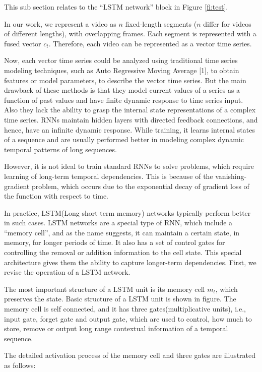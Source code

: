 This sub section relates to
the ``LSTM network'' block in Figure \ref{fi:test}.

In our work, we represent a video as $n$
fixed-length segments ($n$ differ for videos of different lengths),  with overlapping frames.  Each segment
is represented with a fused vector $c_{t}$. Therefore, each video can be represented as a vector time series.


Now, each vector time series could be  analyzed using traditional time series modeling techniques,
such as Auto Regressive Moving Average [1], to obtain features or model parameters, to describe the
vector time series.
But the main drawback of these methods is that they model current values of a series as a function of past values
and have finite dynamic response to time series input. Also they lack the ability to grasp the internal state
representations of a complex time series. RNNs maintain hidden layers with directed feedback connections, and hence,
have an infinite dynamic response. While training, it learns internal states of a sequence
and are usually performed better in modeling complex dynamic temporal patterns of long sequences.


However, it is not ideal to train standard RNNs to solve problems,
which require learning of long-term temporal dependencies. This is because of the vanishing-gradient problem, which occurs
due to the exponential decay of gradient loss of the function with respect to time.

In practice, LSTM(Long short term memory) networks typically perform better in such cases.
LSTM networks are a special type of RNN, which include a ``memory cell'', and as the name suggests,
it can maintain a certain state, in memory, for longer periods of time.
It also has a set of control gates for controlling the removal or addition information to the cell state.
This special architecture gives them the ability to capture longer-term dependencies. First, we revise the operation of a LSTM
network.

The most important structure of a LSTM unit is its memory cell $m_{t}$, which preserves the state. Basic structure of a LSTM
unit is shown in figure. The memory cell is self connected, and it has three gates(multiplicative units), i.e., input gate, forget gate and
output gate, which are used to control, how much to store, remove or output long range contextual information of a temporal sequence.

The detailed activation process of the memory cell and three gates are
illustrated as follows:

